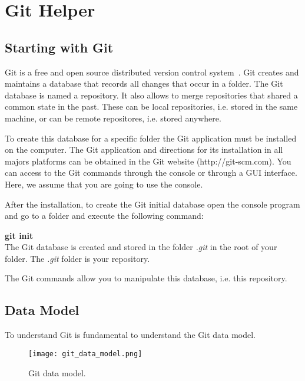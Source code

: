 \chapter{Git Helper}

\begin{refsection}

\section{Starting with Git}

Git is a free and open source distributed version control system~\cite{Chacon14}.
Git creates and maintains a database that records all changes that occur in a folder.
The Git database is named a repository.
It also allows to merge repositories that shared a common state in the past.
These can be local repositories, i.e. stored in the same machine, or can be remote repositores, i.e. stored anywhere.

To create this database for a specific folder the Git application must be installed on the computer.
The Git application and directions for its installation in all majors platforms can be obtained in the Git website (http://git-scm.com). You can access to the Git commands through the console or through a GUI interface.
Here, we assume that you are going to use the console.

After the installation, to create the Git initial database open the console program and go to a folder and execute the following command:
\\[0mm]
\par\textbf{git init}
\\[5mm]
The Git database is created and stored in the folder \emph{.git} in the root of your folder.
The \emph{.git} folder is your repository.

The Git commands allow you to manipulate this database, i.e. this repository.

\section{Data Model}

To understand Git is fundamental to understand the Git data model.

\begin{figure}[h!]
  \centering
  \texttt{[image: git\_data\_model.png]}
  \caption{Git data model.}\label{git_data_model}
\end{figure}


\end{refsection}
